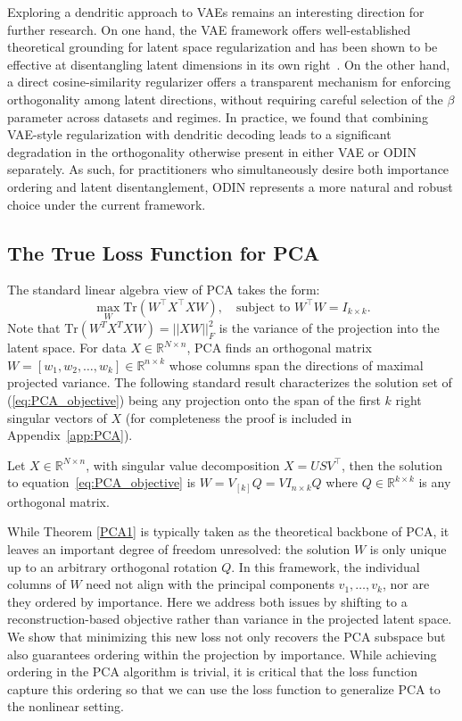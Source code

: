 \documentclass[twoside,11pt]{article}
\begin{document}
Exploring a dendritic approach to VAEs remains an interesting direction for further research.  On one hand, the VAE framework offers well-established theoretical grounding for latent space regularization and has been shown to be effective at disentangling latent dimensions in its own right~\cite{higgins2017beta, rolinek2019variational}. On the other hand, a direct cosine-similarity regularizer offers a transparent mechanism for enforcing orthogonality among latent directions, without requiring careful selection of the $\beta$ parameter across datasets and regimes. In practice, we found that combining VAE-style regularization with dendritic decoding leads to a significant degradation in the orthogonality otherwise present in either VAE or ODIN separately. As such, for practitioners who simultaneously desire both importance ordering and latent disentanglement, ODIN represents a more natural and robust choice under the current framework.

\subsection{The True Loss Function for PCA}

The standard linear algebra view of PCA takes the form: \begin{equation}
    \max_W  \text{Tr}(W^\top X^\top X W), \quad \text{subject to  } W^\top W = I_{k\times k}.
    \label{eq:PCA_objective}
\end{equation}
Note that $\text{Tr}(W^T X^T X W) = ||XW||_F^2$ is the variance of the projection into the latent space. For data $X\in \mathbb{R}^{N\times n}$, PCA finds an orthogonal matrix $W = [w_1, w_2, \dots, w_k]\in \mathbb{R}^{n\times k}$ whose columns span the directions of maximal projected variance. The following standard result characterizes the solution set of (\ref{eq:PCA_objective}) being any projection onto the span of the first $k$ right singular vectors of $X$ (for completeness the proof is included in Appendix~\ref{app:PCA}).

\begin{theorem}\label{PCA1}
    Let $X \in \mathbb{R}^{N \times n}$, with singular value decomposition $X=USV^\top$, then the solution to equation~\ref{eq:PCA_objective} is $W=V_{[k]}Q=VI_{n\times k}Q$ where $Q \in \mathbb{R}^{k\times k}$ is any orthogonal matrix.
\end{theorem}
While Theorem \ref{PCA1} is typically taken as the theoretical backbone of PCA, it leaves an important degree of freedom unresolved: the solution $W$ is only unique up to an arbitrary orthogonal rotation $Q$. In this framework, the individual columns of $W$ need not align with the principal components $v_1, \dots, v_k$, nor are they ordered by importance. Here we address both issues by shifting to a reconstruction-based objective rather than variance in the projected latent space. We show that minimizing this new loss not only recovers the PCA subspace but also guarantees ordering within the projection by importance.  While achieving ordering in the PCA algorithm is trivial, it is critical that the loss function capture this ordering so that we can use the loss function to generalize PCA to the nonlinear setting.
\end{document}
